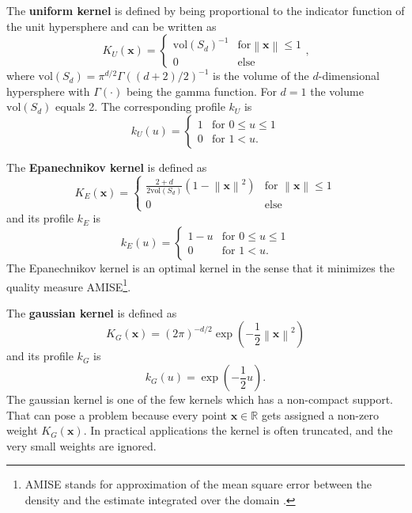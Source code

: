 \documentclass{article}
\newcommand{\norm}[1]{\left\lVert#1\right\rVert}
\begin{document}
The \textbf{uniform kernel} is defined by being proportional to the indicator function of the unit hypersphere and can be written as
\begin{equation}
	K_U(\bm{x}) = \begin{cases}
		\text{vol}(S_d)^{-1} & \text{for} \norm{\bm{x}} \leq 1\\
		0 & \text{else}
	\end{cases}\text{,}
\end{equation}
where $\text{vol}(S_d) = \pi^{d/2}\Gamma((d+2)/2)^{-1}$ is the volume of the $d$-dimensional hypersphere with $\Gamma(\cdot)$ being the gamma function. For $d=1$ the volume $\text{vol}(S_d)$ equals 2. The corresponding profile $k_U$ is
\begin{equation}
	k_U(u) = \begin{cases}
		1 & \text{for } 0 \leq u \leq 1\\
		0 & \text{for } 1 < u\text{.}
	\end{cases}
\end{equation}

The \textbf{Epanechnikov kernel} is defined as
\begin{equation}
	K_E(\bm{x}) = \begin{cases}
		\frac{2 + d}{2 \text{vol}(S_d)} (1 - \norm{\bm{x}}^2) & \text{for } \norm{\bm{x}} \leq 1\\
		0 & \text{else}
	\end{cases}
\end{equation}
and its profile $k_E$ is
\begin{equation}
	k_E(u) = \begin{cases}
		1 - u & \text{for } 0 \leq u \leq 1\\
		0 & \text{for } 1 < u\text{.}
	\end{cases}
\end{equation}
The Epanechnikov kernel is an optimal kernel in the sense that it minimizes the quality measure AMISE\footnote{AMISE stands for approximation of the mean square error between the density and the estimate integrated over the domain \citep[p. 5]{Comaniciu.2002}.}.

The \textbf{gaussian kernel} is defined as
\begin{equation}
	K_G(\bm{x}) = (2 \pi)^{-d/2} \exp\left(-\frac{1}{2} \norm{\bm{x}}^2\right)
\end{equation}
and its profile $k_G$ is
\begin{equation}
	k_G(u) = \exp\left(-\frac{1}{2}u\right)\text{.}
\end{equation}
The gaussian kernel is one of the few kernels which has a non-compact support. That can pose a problem because every point $\bm{x}\in\mathbb{R}$ gets assigned a non-zero weight $K_G(\bm{x})$. In practical applications the kernel is often truncated, and the very small weights are ignored.
\end{document}

